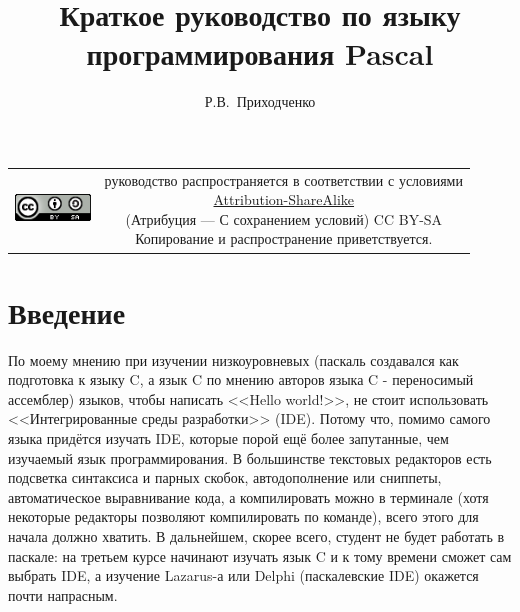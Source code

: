 \documentclass[unicode, 12pt, a4paper,oneside,fleqn]{article}
\author{Р.В.~Приходченко}
\title{Краткое руководство по языку программирования Pascal}
\begin{document}
\renewcommand\refname{\centering Список литературы}



\maketitle
\tableofcontents


\begin{table}[ht]
  \begin{tabular}{cc}
    \includegraphics[width=2cm]{CC_BY-SA_88x31.png} &
    \shortstack{руководство распространяется в соответствии с
      условиями\\
      \href{http://creativecommons.org/licenses/by-sa/3.0/}{Attribution-ShareAlike} \\
      (Атрибуция — С сохранением условий) CC BY-SA \\
      Копирование и распространение приветствуется.}
  \end{tabular}
\end{table}

\section*{Введение}
По моему мнению при изучении низкоуровневых (паскаль создавался как
подготовка к языку C, а язык C по мнению авторов языка C - переносимый
ассемблер) языков, чтобы написать <<Hello world!>>, не стоит
использовать <<Интегрированные среды разработки>> (IDE). Потому что,
помимо самого языка придётся изучать IDE, которые порой ещё более
запутанные, чем изучаемый язык программирования. В большинстве
текстовых редакторов есть подсветка синтаксиса и парных скобок,
автодополнение или сниппеты, автоматическое выравнивание кода, а
компилировать можно в терминале (хотя некоторые редакторы позволяют
компилировать по команде), всего этого для начала должно хватить. В
дальнейшем, скорее всего, студент не будет работать в паскале: на
третьем курсе начинают изучать язык C и к тому времени сможет сам
выбрать IDE, а изучение Lazarus-а или Delphi (паскалевские IDE)
окажется почти напрасным.
\end{document}
